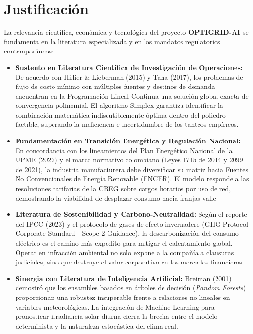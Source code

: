 \documentclass[11pt,a4paper]{article}
\begin{document}
\section{Justificación}
La relevancia científica, económica y tecnológica del proyecto \textbf{OPTIGRID-AI} se fundamenta en la literatura especializada y en los mandatos regulatorios contemporáneos:

\begin{itemize}
    \item \textbf{Sustento en Literatura Científica de Investigación de Operaciones:} De acuerdo con Hillier \& Lieberman (2015) y Taha (2017), los problemas de flujo de costo mínimo con múltiples fuentes y destinos de demanda encuentran en la Programación Lineal Continua una solución global exacta de convergencia polinomial. El algoritmo Simplex garantiza identificar la combinación matemática indiscutiblemente óptima dentro del poliedro factible, superando la ineficiencia e incertidumbre de los tanteos empíricos.
    \item \textbf{Fundamentación en Transición Energética y Regulación Nacional:} En concordancia con los lineamientos del Plan Energético Nacional de la UPME (2022) y el marco normativo colombiano (Leyes 1715 de 2014 y 2099 de 2021), la industria manufacturera debe diversificar su matriz hacia Fuentes No Convencionales de Energía Renovable (FNCER). El modelo responde a las resoluciones tarifarias de la CREG sobre cargos horarios por uso de red, demostrando la viabilidad de desplazar consumo hacia franjas valle.
    \item \textbf{Literatura de Sostenibilidad y Carbono-Neutralidad:} Según el reporte del IPCC (2023) y el protocolo de gases de efecto invernadero (GHG Protocol Corporate Standard - Scope 2 Guidance), la descarbonización del consumo eléctrico es el camino más expedito para mitigar el calentamiento global. Operar en infracción ambiental no solo expone a la compañía a clausuras judiciales, sino que destruye el valor corporativo en los mercados financieros.
    \item \textbf{Sinergia con Literatura de Inteligencia Artificial:} Breiman (2001) demostró que los ensambles basados en árboles de decisión (\textit{Random Forests}) proporcionan una robustez insuperable frente a relaciones no lineales en variables meteorológicas. La integración de Machine Learning para pronosticar irradiancia solar diurna cierra la brecha entre el modelo determinista y la naturaleza estocástica del clima real.
\end{itemize}
\end{document}
